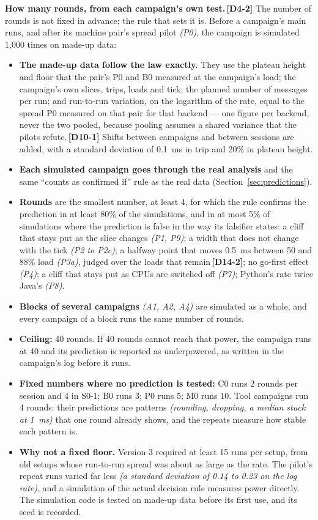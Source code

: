 \documentclass[11pt]{article}
\newcommand{\gl}[1]{{\color{soft}\itshape\small (#1)}}
\newcommand{\chg}[1]{\,{\color{chgcol}\bfseries\footnotesize[#1]}}
\newcommand{\chgold}[1]{\,{\color{oldcol}\bfseries\footnotesize[#1]}}
\begin{document}
\textbf{How many rounds, from each campaign's own test.}\chgold{D4-2} The number of rounds is not fixed in advance; the rule that sets it is. Before a campaign's main runs, and after its machine pair's spread pilot \gl{P0}, the campaign is simulated 1,000 times on made-up data:
\begin{itemize}
  \item \textbf{The made-up data follow the law exactly.} They use the plateau height and floor that the pair's P0 and B0 measured at the campaign's load; the campaign's own slices, trips, loads and tick; the planned number of messages per run; and run-to-run variation, on the logarithm of the rate, equal to the spread P0 measured on that pair for that backend --- one figure per backend, never the two pooled, because pooling assumes a shared variance that the pilots refute.\chg{D10-1} Shifts between campaigns and between sessions are added, with a standard deviation of 0.1~ms in trip and 20\% in plateau height.
  \item \textbf{Each simulated campaign goes through the real analysis} and the same ``counts as confirmed if'' rule as the real data (Section~\ref{sec:predictions}).
  \item \textbf{Rounds} are the smallest number, at least 4, for which the rule confirms the prediction in at least 80\% of the simulations, and in at most 5\% of simulations where the prediction is false in the way its falsifier states: a cliff that stays put as the slice changes \gl{P1, P9}; a width that does not change with the tick \gl{P2 to P2c}; a halfway point that moves 0.5~ms between 50 and 88\% load \gl{P3a}, judged over the loads that remain\chg{D14-2}; no go-first effect \gl{P4}; a cliff that stays put as CPUs are switched off \gl{P7}; Python's rate twice Java's \gl{P8}.
  \item \textbf{Blocks of several campaigns} \gl{A1, A2, A4} are simulated as a whole, and every campaign of a block runs the same number of rounds.
  \item \textbf{Ceiling:} 40 rounds. If 40 rounds cannot reach that power, the campaign runs at 40 and its prediction is reported as underpowered, as written in the campaign's log before it runs.
  \item \textbf{Fixed numbers where no prediction is tested:} C0 runs 2 rounds per session and 4 in S0-1; B0 runs 3; P0 runs 5; M0 runs 10. Tool campaigns run 4 rounds: their predictions are patterns \gl{rounding, dropping, a median stuck at 1~ms} that one round already shows, and the repeats measure how stable each pattern is.
  \item \textbf{Why not a fixed floor.} Version 3 required at least 15 runs per setup, from old setups whose run-to-run spread was about as large as the rate. The pilot's repeat runs varied far less \gl{a standard deviation of 0.14 to 0.23 on the log rate}, and a simulation of the actual decision rule measures power directly. The simulation code is tested on made-up data before its first use, and its seed is recorded.
\end{itemize}
\end{document}
